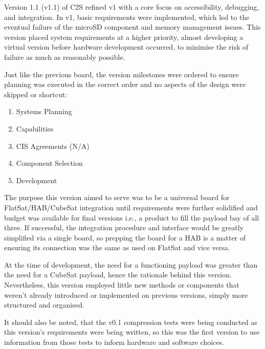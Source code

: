 Version 1.1 (v1.1) of C2S refined v1 with a core focus on accessibility, debugging, and integration. In v1, basic requirements were implemented, which led to the eventual failure of the microSD component and memory management issues. This version placed system requirements at a higher priority, almost developing a virtual version before hardware development occurred, to minimise the risk of failure as much as reasonably possible.

Just like the previous board, the version milestones were ordered to ensure planning was executed in the correct order and no aspects of the design were skipped or shortcut:

\begin{enumerate}
    \item Systems Planning
    \item Capabilities
    \item CIS Agreements (N/A)
    \item Component Selection
    \item Development
\end{enumerate}

The purpose this version aimed to serve was to be a universal board for FlatSat/HAB/CubeSat integration until requirements were further solidified and budget was available for final versions i.e., a product to fill the payload bay of all three. If successful, the integration procedure and interface would be greatly simplified via a single board, so prepping the board for a HAB is a matter of ensuring its connection was the same as used on FlatSat and vice versa.

At the time of development, the need for a functioning payload was greater than the need for a CubeSat payload, hence the rationale behind this version. Nevertheless, this version employed little new methods or components that weren't already introduced or implemented on previous versions, simply more structured and organised.

It should also be noted, that the v0.1 compression tests were being conducted as this version's requirements were being written, so this was the first version to use information from those tests to inform hardware and software choices.


